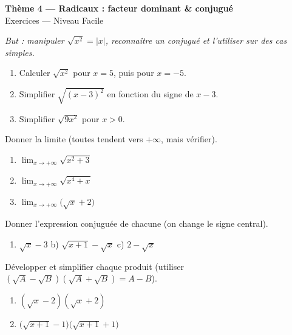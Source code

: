 \documentclass[11pt,a4paper]{article}
\begin{document}
\begin{center}
{\Large\bfseries\color{primarydark}Thème 4 — Radicaux : facteur dominant \& conjugué}\\[2pt]
{\large\color{primary}Exercices — Niveau Facile}
\end{center}
\vspace{4pt}
{\small\itshape But : manipuler $\sqrt{x^2}=|x|$, reconnaître un conjugué et l'utiliser sur des cas
simples.}
\vspace{6pt}

\begin{exercice}[$\sqrt{x^2}=|x|$]
\begin{enumerate}[label=\alph*),leftmargin=2em,itemsep=3pt]
  \item Calculer $\sqrt{x^2}$ pour $x=5$, puis pour $x=-5$.
  \item Simplifier $\sqrt{(x-3)^2}$ en fonction du signe de $x-3$.
  \item Simplifier $\sqrt{9x^2}$ pour $x>0$.
\end{enumerate}
\end{exercice}

\begin{exercice}
Donner la limite (toutes tendent vers $+\infty$, mais vérifier).
\begin{enumerate}[label=\alph*),leftmargin=2em,itemsep=3pt]
  \item $\displaystyle\lim_{x\to+\infty}\sqrt{x^2+3}$
  \item $\displaystyle\lim_{x\to+\infty}\sqrt{x^4+x}$
  \item $\displaystyle\lim_{x\to+\infty}\bigl(\sqrt{x}+2\bigr)$
\end{enumerate}
\end{exercice}

\begin{exercice}
Donner l'expression conjuguée de chacune (on change le signe central).
\begin{enumerate}[label=\alph*),leftmargin=2em,itemsep=3pt]
  \item $\sqrt{x}-3$ \qquad b) $\sqrt{x+1}-\sqrt{x}$ \qquad c) $2-\sqrt{x}$
\end{enumerate}
\end{exercice}

\begin{exercice}
Développer et simplifier chaque produit (utiliser $(\sqrt A-\sqrt B)(\sqrt A+\sqrt B)=A-B$).
\begin{enumerate}[label=\alph*),leftmargin=2em,itemsep=3pt]
  \item $(\sqrt{x}-2)(\sqrt{x}+2)$
  \item $\bigl(\sqrt{x+1}-1\bigr)\bigl(\sqrt{x+1}+1\bigr)$
\end{enumerate}
\end{exercice}
\end{document}
